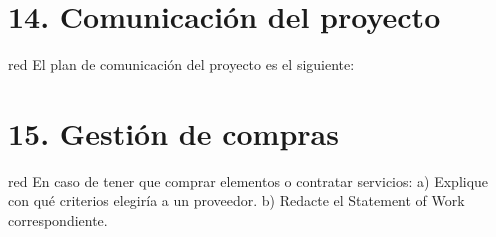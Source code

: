 \documentclass[11pt]{charter}
\begin{document}
\section{14. Comunicación del proyecto}
\label{sec:comunicaciones}

\begin{consigna}{red}
El plan de comunicación del proyecto es el siguiente:
\end{consigna}

\begin{table}[htpb]
\centering
{}
\end{table}

\section{15. Gestión de compras}
\label{sec:compras}

\begin{consigna}{red}
En caso de tener que comprar elementos o contratar servicios:
a) Explique con qué criterios elegiría a un proveedor.
b) Redacte el Statement of Work correspondiente.
\end{consigna}
\end{document}
